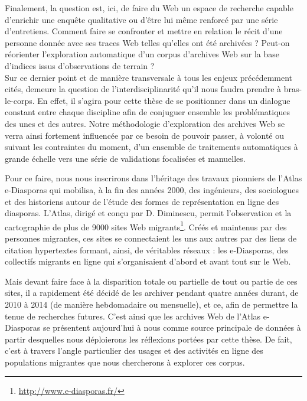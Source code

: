 \documentclass[symmetric,justified,marginals=raggedouter]{tufte-book}
\begin{document}
Finalement, la question est, ici, de faire du Web un espace de recherche capable d'enrichir une enquête qualitative ou d'être lui même renforcé par une série d'entretiens. Comment faire se confronter et mettre en relation le récit d'une personne donnée avec ses traces Web telles qu'elles ont été archivées ? Peut-on réorienter l'exploration automatique d'un corpus d'archives Web sur la base d'indices issus d'observations de terrain ?\\

\noindent Sur ce dernier point et de manière transversale à tous les enjeux précédemment cités, demeure la question de l'interdisciplinarité qu'il nous faudra prendre à bras-le-corps. En effet, il s'agira pour cette thèse de se positionner dans un dialogue constant entre chaque discipline afin de conjuguer ensemble les problématiques des unes et des autres. Notre méthodologie d'exploration des archives Web se verra ainsi fortement influencée par ce besoin de pouvoir passer, à volonté ou suivant les contraintes du moment, d'un ensemble de traitements automatiques à grande échelle vers une série de validations focalisées et manuelles. 

Pour ce faire, nous nous inscrirons dans l'héritage des travaux pionniers de l'Atlas e-Diasporas \citep{diminescu_e-diasporas_2012} qui mobilisa, à la fin des années 2000, des ingénieurs, des sociologues et des historiens autour de l'étude des formes de représentation en ligne des diasporas. L'Atlas, dirigé et conçu par D. Diminescu, permit l'observation et la cartographie de plus de 9000 sites Web migrants\footnote{\RaggedOuter \url{http://www.e-diasporas.fr/}}. Créés et maintenus par des personnes migrantes, ces sites se connectaient les uns aux autres par des liens de citation hypertextes formant, ainsi, de véritables réseaux : les e-Diasporas, des collectifs migrants en ligne qui s'organisaient d'abord et avant tout sur le Web. 

Mais devant faire face à la disparition totale ou partielle de tout ou partie de ces sites, il a rapidement été décidé de les archiver pendant quatre années durant, de 2010 à 2014 (de manière hebdomadaire ou mensuelle), et ce, afin de permettre la tenue de recherches futures. C'est ainsi que les archives Web de l'Atlas e-Diasporas se présentent aujourd'hui à nous comme source principale de données à partir desquelles nous déploierons les réflexions portées par cette thèse. De fait, c'est à travers l'angle particulier des usages et des activités en ligne des populations migrantes que nous chercherons à explorer ces corpus. \\
\end{document}
